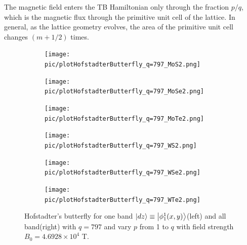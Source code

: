 \documentclass{report}
\begin{document}
The magnetic field enters the TB Hamiltonian only through the fraction $p/q$, which is the magnetic flux through the primitive unit cell of the lattice. In general, as the lattice geometry evolves, the area of the primitive unit cell changes $(m + 1/2)$ times.

\begin{figure}[htb]
	\centering
	\begin{subfigure}[b]{0.32\linewidth}
		\centering
		\texttt{[image: pic/plotHofstadterButterfly\_q=797\_MoS2.png]}
		\label{fig:matt 1}
	\end{subfigure}
	\begin{subfigure}[b]{0.32\linewidth}
		\centering
		\texttt{[image: pic/plotHofstadterButterfly\_q=797\_MoSe2.png]}
		\label{fig:matt 2}
	\end{subfigure}
	\begin{subfigure}[b]{0.32\linewidth}
		\centering
		\texttt{[image: pic/plotHofstadterButterfly\_q=797\_MoTe2.png]}
		\label{fig:matt 3}
	\end{subfigure}
	\begin{subfigure}[b]{0.32\linewidth}
		\centering
		\texttt{[image: pic/plotHofstadterButterfly\_q=797\_WS2.png]}
		\label{fig:matt 4}
	\end{subfigure}
	\begin{subfigure}[b]{0.32\linewidth}
		\centering
		\texttt{[image: pic/plotHofstadterButterfly\_q=797\_WSe2.png]}
		\label{fig:matt 5}
	\end{subfigure}
	\begin{subfigure}[b]{0.32\linewidth}
		\centering
		\texttt{[image: pic/plotHofstadterButterfly\_q=797\_WTe2.png]}
		\label{fig:matt 6}
	\end{subfigure}
	\caption{
		Hofstadter’s butterfly for one band $\ket{dz} \equiv \ket{\phi_{1}^{1}(x,y)}$(left) and all band(right) with $q = 797$ and vary $p$  from 1 to $q$ with field strength $B_{0} = 4.6928 \times 10^{4}$ T.
	}
\end{figure}
\end{document}
